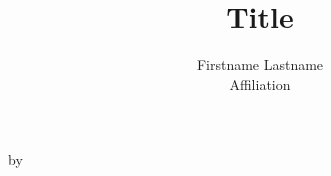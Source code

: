 \ProcessOptions
{}
\RequirePackage{graphicx,color,ae,fancyvrb}
\RequirePackage[T1]{fontenc}
\if@shortnames
  \usepackage[authoryear,round]{natbib}
\else
  \usepackage[authoryear,round,longnamesfirst]{natbib}
\fi
{}

\topmargin 0pt
\baselineskip
\advance\textheight by \topskip
\oddsidemargin 0.1in
\evensidemargin 0.15in
\marginparwidth 1in
\oddsidemargin 0.125in
\evensidemargin 0.125in
\marginparwidth 0.75in
\textwidth 6.125in
\setlength{\parskip}{0.7ex plus0.1ex minus0.1ex}
\setlength{\parindent}{0em}
\newcommand{\Address}[1]{\def\@Address{#1}}
\newcommand{\Plaintitle}[1]{\def\@Plaintitle{#1}}
\newcommand{\Shorttitle}[1]{\def\@Shorttitle{#1}}
\newcommand{\Plainauthor}[1]{\def\@Plainauthor{#1}}
\newcommand{\Volume}[1]{\def\@Volume{#1}}
\newcommand{\Year}[1]{\def\@Year{#1}}
\newcommand{\Month}[1]{\def\@Month{#1}}
\newcommand{\Issue}[1]{\def\@Issue{#1}}
\newcommand{\Submitdate}[1]{\def\@Submitdate{#1}}
\newcommand{\Acceptdate}[1]{\def\@Acceptdate{#1}}
\newcommand{\Abstract}[1]{\def\@Abstract{#1}}
\newcommand{\Keywords}[1]{\def\@Keywords{#1}}
\newcommand{\Plainkeywords}[1]{\def\@Plainkeywords{#1}}
\newcommand{\Reviewer}[1]{\def\@Reviewer{#1}}
\newcommand{\Booktitle}[1]{\def\@Booktitle{#1}}
\newcommand{\Bookauthor}[1]{\def\@Bookauthor{#1}}
\newcommand{\Publisher}[1]{\def\@Publisher{#1}}
\newcommand{\Pubaddress}[1]{\def\@Pubaddress{#1}}
\newcommand{\Pubyear}[1]{\def\@Pubyear{#1}}
\newcommand{\ISBN}[1]{\def\@ISBN{#1}}
\newcommand{\Pages}[1]{\def\@Pages{#1}}
\newcommand{\Price}[1]{\def\@Price{#1}}
\newcommand{\Plainreviewer}[1]{\def\@Plainreviewer{#1}}
\newcommand{\Softwaretitle}[1]{\def\@Softwaretitle{#1}}
\newcommand{\URL}[1]{\def\@URL{#1}}
\newcommand{\DOI}[1]{\def\@DOI{#1}}
\newcommand{\Seriesname}[1]{\def\@Seriesname{#1}}
\newcommand{\Hypersubject}[1]{\def\@Hypersubject{#1}}
\newcommand{\Hyperauthor}[1]{\def\@Hyperauthor{#1}}
\newcommand{\Footername}[1]{\def\@Footername{#1}}
\newcommand{\Firstdate}[1]{\def\@Firstdate{#1}}
\newcommand{\Seconddate}[1]{\def\@Seconddate{#1}}
\newcommand{\Reviewauthor}[1]{\def\@Reviewauthor{#1}}
\author{Firstname Lastname\\Affiliation}
\title{Title}
\Abstract{---!!!---an abstract is required---!!!---}
\Plainauthor{\@author}
\Volume{VV}
\Year{YYYY}
\Month{MMMMMM}
\Issue{II}
\Submitdate{yyyy-mm-dd}
\Acceptdate{yyyy-mm-dd}
\Address{
  Firstname Lastname\\
  Affiliation\\
  Address, Country\\
  E-mail: \email{name@address}\\
  URL: \url{http://link/to/webpage/}
}

